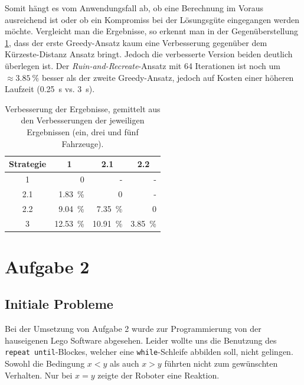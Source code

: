 \documentclass[ngerman]{tudscrreprt}
\newcommand{\code}[1]{\texttt{#1}}
\begin{document}
Somit hängt es vom Anwendungsfall ab, ob eine Berechnung im Voraus ausreichend ist oder
ob ein Kompromiss bei der Lösungsgüte eingegangen werden möchte.
Vergleicht man die Ergebnisse, so erkennt man in der Gegenüberstellung
\ref{table:compare-strategies}, dass der erste Greedy-Ansatz kaum eine Verbesserung
gegenüber dem Kürzeste-Distanz Ansatz bringt.
Jedoch die verbesserte Version beiden deutlich überlegen ist.
Der \emph{Ruin-and-Recreate}-Ansatz mit 64 Iterationen ist noch um $\approx \SI{3.85}{\percent}$ besser als
der zweite Greedy-Ansatz, jedoch auf Kosten einer höheren
Laufzeit (\SI{0.25}{\s} vs. \SI{3}{\s}).

\begin{table}[H]
    \centering
    \begin{tabular}{|c|r|r|r|}
    \hline\centering
    Strategie & \multicolumn{1}{c|}{1} & \multicolumn{1}{c|}{2.1} & \multicolumn{1}{c|}{2.2}
                                                                                        \\ \hline
    1         & 0                      & -                        & -                   \\ \hline
    2.1       & \SI{ 1.83}{\percent}   & 0                        & -                   \\ \hline
    2.2       & \SI{ 9.04}{\percent}   & \SI{ 7.35}{\percent}     & 0                   \\ \hline
    3         & \SI{12.53}{\percent}   & \SI{10.91}{\percent}     & \SI{3.85}{\percent} \\ \hline
    \end{tabular}
    \caption{Verbesserung der Ergebnisse, gemittelt aus den Verbesserungen der jeweiligen
    Ergebnissen (ein, drei und fünf Fahrzeuge).}
    \label{table:compare-strategies}
\end{table}

\chapter{Aufgabe 2}
\section{Initiale Probleme}
Bei der Umsetzung von Aufgabe 2 wurde zur Programmierung von der hauseigenen Lego Software
abgesehen. Leider wollte uns die Benutzung des \code{repeat until}-Blockes, welcher eine
\code{while}-Schleife abbilden soll, nicht gelingen. Sowohl die Bedingung $x < y$ als auch
$x > y$ führten nicht zum gewünschten Verhalten. Nur bei $x = y$ zeigte der Roboter eine
Reaktion.
\end{document}
